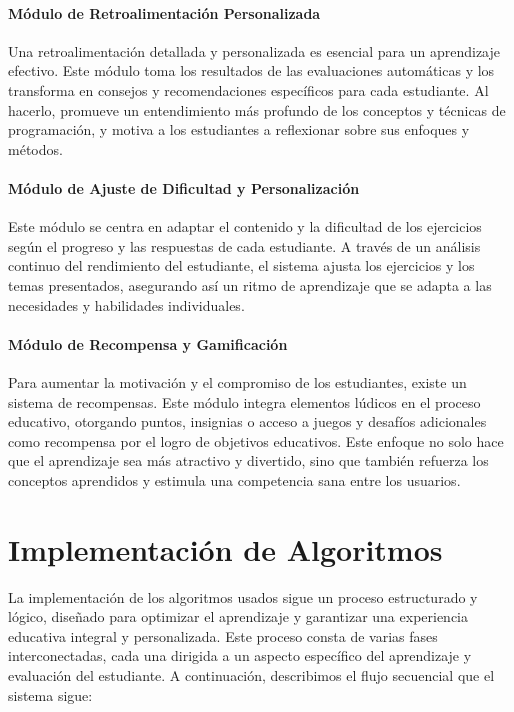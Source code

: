 \paragraph{Módulo de Retroalimentación Personalizada}

Una retroalimentación detallada y personalizada es esencial para un aprendizaje efectivo. Este módulo toma los resultados de las evaluaciones automáticas y los transforma en consejos y recomendaciones específicos para cada estudiante. Al hacerlo, promueve un entendimiento más profundo de los conceptos y técnicas de programación, y motiva a los estudiantes a reflexionar sobre sus enfoques y métodos.

\paragraph{Módulo de Ajuste de Dificultad y Personalización}

Este módulo se centra en adaptar el contenido y la dificultad de los ejercicios según el progreso y las respuestas de cada estudiante. A través de un análisis continuo del rendimiento del estudiante, el sistema ajusta los ejercicios y los temas presentados, asegurando así un ritmo de aprendizaje que se adapta a las necesidades y habilidades individuales.


\paragraph{Módulo de Recompensa y Gamificación}

Para aumentar la motivación y el compromiso de los estudiantes, existe un sistema de recompensas. Este módulo integra elementos lúdicos en el proceso educativo, otorgando puntos, insignias o acceso a juegos y desafíos adicionales como recompensa por el logro de objetivos educativos. Este enfoque no solo hace que el aprendizaje sea más atractivo y divertido, sino que también refuerza los conceptos aprendidos y estimula una competencia sana entre los usuarios.

\section{Implementación de Algoritmos}

La implementación de los algoritmos usados sigue un proceso estructurado y lógico, diseñado para optimizar el aprendizaje y garantizar una experiencia educativa integral y personalizada. Este proceso consta de varias fases interconectadas, cada una dirigida a un aspecto específico del aprendizaje y evaluación del estudiante. A continuación, describimos el flujo secuencial que el sistema sigue:

